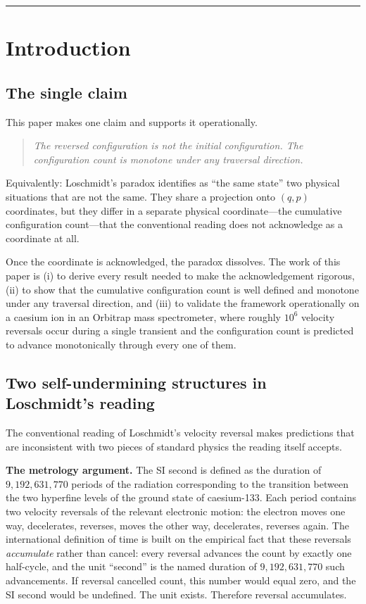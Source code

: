 \documentclass[twocolumn,10pt,a4paper]{article}
\theoremstyle{thmstyle}
\theoremstyle{definition}
\theoremstyle{remark}
\begin{document}
\tableofcontents
\bigskip\hrule\bigskip

\section{Introduction}
\label{sec:intro}

\subsection{The single claim}

This paper makes one claim and supports it operationally.

\begin{quote}
\emph{The reversed configuration is not the initial configuration.
The configuration count is monotone under any traversal direction.}
\end{quote}

Equivalently: Loschmidt's paradox \citep{loschmidt1876,boltzmann1877}
identifies as ``the same state'' two physical situations that are
not the same. They share a projection onto $(q,p)$ coordinates, but
they differ in a separate physical coordinate---the cumulative
configuration count---that the conventional reading does not
acknowledge as a coordinate at all.

Once the coordinate is acknowledged, the paradox dissolves. The work
of this paper is (i) to derive every result needed to make the
acknowledgement rigorous, (ii) to show that the cumulative
configuration count is well defined and monotone under any traversal
direction, and (iii) to validate the framework operationally on
a caesium ion in an Orbitrap mass spectrometer, where roughly
$10^{6}$ velocity reversals occur during a single transient and the
configuration count is predicted to advance monotonically through
every one of them.

\subsection{Two self-undermining structures in Loschmidt's reading}

The conventional reading of Loschmidt's velocity reversal makes
predictions that are inconsistent with two pieces of standard
physics the reading itself accepts.

\textbf{The metrology argument.} The SI second is defined as the
duration of $9{,}192{,}631{,}770$ periods of the radiation
corresponding to the transition between the two hyperfine levels of
the ground state of caesium-133. Each period contains two velocity
reversals of the relevant electronic motion: the electron moves one
way, decelerates, reverses, moves the other way, decelerates, reverses
again. The international definition of time is built on the empirical
fact that these reversals \emph{accumulate} rather than cancel: every
reversal advances the count by exactly one half-cycle, and the unit
``second'' is the named duration of $9{,}192{,}631{,}770$ such
advancements. If reversal cancelled count, this number would equal
zero, and the SI second would be undefined. The unit exists. Therefore
reversal accumulates.
\end{document}
